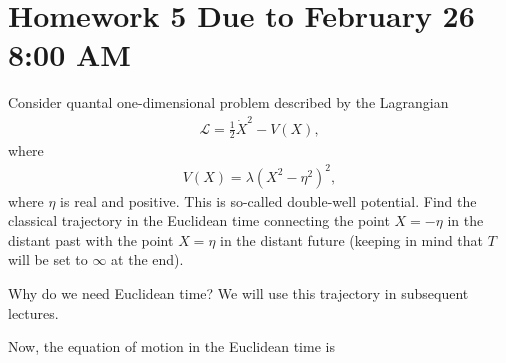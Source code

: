 \section*{Homework 5 Due to February 26 8:00 AM}
Consider quantal one-dimensional problem described by the Lagrangian
\begin{align}
    \mathcal{L} = \frac{1}{2} \dot{X}^2 - V(X),
\end{align}
where 
\begin{align}
    V(X) = \lambda (X^2 - \eta^2)^2,
\end{align}
where $\eta$ is real and positive. This is so-called double-well potential. Find the classical trajectory in the Euclidean time connecting the point $X = -\eta$ in the distant past with the
point $X = \eta$ in the distant future (keeping in mind that $T$ will be set to $\infty$ at the end). 

Why do we need Euclidean time? We will use this trajectory in subsequent lectures.

\answer{}
Now, the equation of motion in the Euclidean time is

